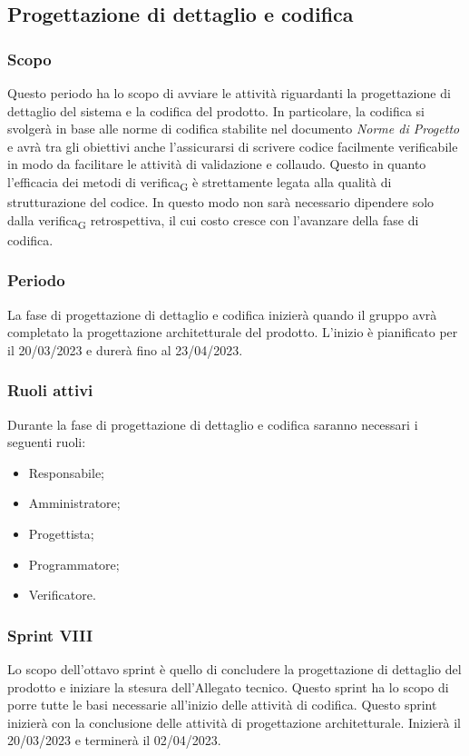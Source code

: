 \subsection{Progettazione di dettaglio e codifica}
\subsubsection{Scopo}
Questo periodo ha lo scopo di avviare le attività riguardanti la progettazione di dettaglio del sistema e la codifica del prodotto.
In particolare, la codifica si svolgerà in base alle norme di codifica stabilite nel documento \textit{Norme di Progetto} e avrà tra gli obiettivi anche l’assicurarsi di scrivere codice facilmente verificabile in modo da facilitare le attività di validazione e collaudo. Questo in quanto l'efficacia dei metodi di verifica\textsubscript{G} è strettamente legata alla qualità di strutturazione del codice. In questo modo non sarà necessario dipendere solo dalla verifica\textsubscript{G} retrospettiva, il cui costo cresce con l'avanzare della fase di codifica.

\subsubsection{Periodo}
La fase di progettazione di dettaglio e codifica inizierà quando il gruppo avrà completato la progettazione architetturale del prodotto. L'inizio è pianificato per il 20/03/2023 e durerà fino al 23/04/2023.

\subsubsection{Ruoli attivi}
Durante la fase di progettazione di dettaglio e codifica saranno necessari i seguenti ruoli:
\begin{itemize}
	\item Responsabile;
	\item Amministratore;
	\item Progettista;
	\item Programmatore;
	\item Verificatore.
\end{itemize}

\subsubsection{Sprint VIII}
Lo scopo dell'ottavo sprint è quello di concludere la progettazione di dettaglio del prodotto e iniziare la stesura dell’Allegato tecnico. Questo sprint ha lo scopo di porre tutte le basi necessarie all'inizio delle attività di codifica.
Questo sprint inizierà con la conclusione delle attività di progettazione architetturale. Inizierà il 20/03/2023 e terminerà il 02/04/2023.

